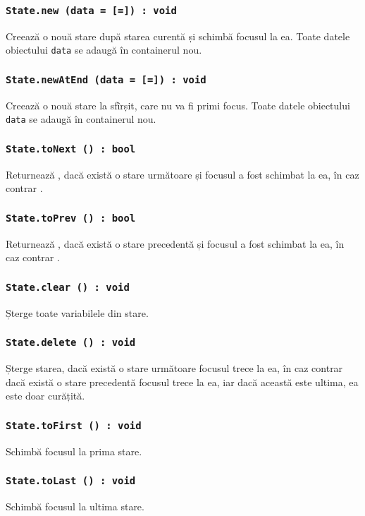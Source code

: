 \subsubsection{\texttt{State.new (data = [=]) : void}}

Creează o nouă stare după starea curentă și schimbă focusul la ea. Toate datele obiectului \texttt{data} se adaugă în containerul nou.

\subsubsection{\texttt{State.newAtEnd (data = [=]) : void}}

Creează o nouă stare la sfîrșit, care nu va fi primi focus.  Toate datele obiectului \texttt{data} se adaugă în containerul nou.

\subsubsection{\texttt{State.toNext () : bool}}

Returnează \true, dacă există o stare următoare și focusul a fost schimbat la ea, în caz contrar \false.

\subsubsection{\texttt{State.toPrev () : bool}}

Returnează \true, dacă există o stare precedentă și focusul a fost schimbat la ea, în caz contrar \false.

\subsubsection{\texttt{State.clear () : void}}

Șterge toate variabilele din stare.

\subsubsection{\texttt{State.delete () : void}}

Șterge starea, dacă există o stare următoare focusul trece la ea, în caz contrar dacă există o stare precedentă focusul trece la ea, iar dacă această este ultima, ea este doar curățită.

\subsubsection{\texttt{State.toFirst () : void}}

Schimbă focusul la prima stare.

\subsubsection{\texttt{State.toLast () : void}}

Schimbă focusul la ultima stare.

